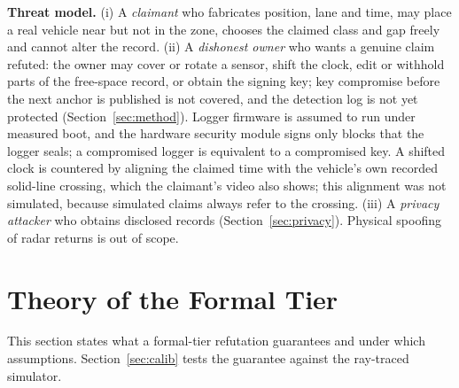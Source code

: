 \textbf{Threat model.} (i) A \emph{claimant} who fabricates position, lane and time, may place a real vehicle near but not in the zone, chooses the claimed class and gap freely and cannot alter the record. (ii) A \emph{dishonest owner} who wants a genuine claim refuted: the owner may cover or rotate a sensor, shift the clock, edit or withhold parts of the free-space record, or obtain the signing key; key compromise before the next anchor is published is not covered, and the detection log is not yet protected (Section~\ref{sec:method}). Logger firmware is assumed to run under measured boot, and the hardware security module signs only blocks that the logger seals; a compromised logger is equivalent to a compromised key. A shifted clock is countered by aligning the claimed time with the vehicle's own recorded solid-line crossing, which the claimant's video also shows; this alignment was not simulated, because simulated claims always refer to the crossing. (iii) A \emph{privacy attacker} who obtains disclosed records (Section~\ref{sec:privacy}). Physical spoofing of radar returns is out of scope.

\section{Theory of the Formal Tier}\label{sec:theory}

This section states what a formal-tier refutation guarantees and under which assumptions. Section~\ref{sec:calib} tests the guarantee against the ray-traced simulator.

